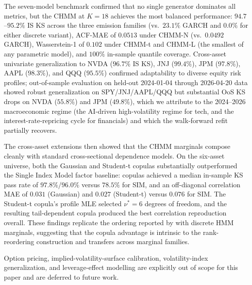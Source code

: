 The seven-model benchmark confirmed that no single generator dominates all metrics, but the CHMM at $K = 18$ achieves the most balanced performance: $94.7$--$95.2\%$ IS KS across the three emission families (vs.\ $23.1\%$ GARCH and $0.0\%$ for either discrete variant), ACF-MAE of $0.0513$ under CHMM-N (vs.\ $0.0492$ GARCH), Wasserstein-1 of $0.102$ under CHMM-t and CHMM-L (the smallest of any parametric model), and $100\%$ in-sample quantile coverage.
Cross-asset univariate generalization to NVDA ($96.7\%$ IS KS), JNJ ($99.4\%$), JPM ($97.8\%$), AAPL ($98.3\%$), and QQQ ($95.5\%$) confirmed adaptability to diverse equity risk profiles; out-of-sample evaluation on held-out 2024-01-04 through 2026-04-20 data showed robust generalization on SPY/JNJ/AAPL/QQQ but substantial OoS KS drops on NVDA ($55.8\%$) and JPM ($49.8\%$), which we attribute to the 2024--2026 macroeconomic regime (the AI-driven high-volatility regime for tech, and the interest-rate-repricing cycle for financials) and which the walk-forward refit partially recovers.

The cross-asset extensions then showed that the CHMM marginals compose cleanly with standard cross-sectional dependence models.
On the six-asset universe, both the Gaussian and Student-t copulas substantially outperformed the Single Index Model factor baseline: copulas achieved a median in-sample KS pass rate of $97.8\%$/$96.0\%$ versus $78.5\%$ for SIM, and an off-diagonal correlation MAE of $0.031$ (Gaussian) and $0.027$ (Student-t) versus $0.076$ for SIM.
The Student-t copula's profile MLE selected $\nu^* = 6$ degrees of freedom, and the resulting tail-dependent copula produced the best correlation reproduction overall.
These findings replicate the ordering reported by \citet{alswaidan2026hybrid} with discrete HMM marginals, suggesting that the copula advantage is intrinsic to the rank-reordering construction and transfers across marginal families.

Option pricing, implied-volatility-surface calibration, volatility-index generalization, and leverage-effect modelling are explicitly out of scope for this paper and are deferred to future work.


